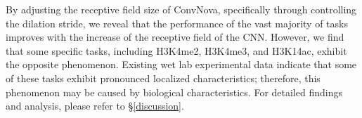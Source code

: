 

By adjusting the receptive field size of ConvNova, specifically through controlling the dilation stride, we reveal that the performance of the vast majority of tasks improves with the increase of the receptive field of the CNN. However, we find that some specific tasks, including H3K4me2, H3K4me3, and H3K14ac, exhibit the opposite phenomenon. Existing wet lab experimental data indicate that some of these tasks exhibit pronounced localized characteristics; therefore, this phenomenon may be caused by biological characteristics. For detailed findings and analysis, please refer to %
\S \ref{discussion}.


